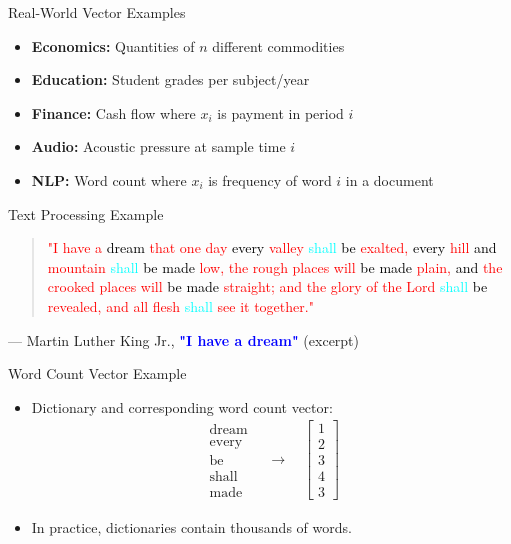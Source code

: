 \begin{frame}{Real-World Vector Examples}
    \begin{itemize}
        \item \textbf{Economics:} Quantities of $n$ different commodities
        \item \textbf{Education:} Student grades per subject/year
        \item \textbf{Finance:} Cash flow where $x_i$ is payment in period $i$
        \item \textbf{Audio:} Acoustic pressure at sample time $i$
        \item \textbf{NLP:} Word count where $x_i$ is frequency of word $i$ in a document
    \end{itemize}
\end{frame}

\begin{frame}{Text Processing Example}
    \begin{quote}
        \textcolor{red}{
        "I have a \textcolor{black}{dream} that one day \textcolor{black}{every} valley \textcolor{cyan}{shall} \textcolor{black}{be} exalted, \textcolor{black}{every} hill \textcolor{black}{and} mountain \textcolor{cyan}{shall}  \textcolor{black}{be} \textcolor{black}{made} low, 
        the rough places will \textcolor{black}{be} \textcolor{black}{made} plain, \textcolor{black}{and} the crooked places will \textcolor{black}{be} \textcolor{black}{made} straight; 
        and the glory of the Lord \textcolor{cyan}{shall}  \textcolor{black}{be} revealed, and all flesh \textcolor{cyan}{shall}  see it together."
        }
    \end{quote}
    \noindent — Martin Luther King Jr., \textcolor{blue}{\textbf{"I have a dream"}} (excerpt)
\end{frame}

\begin{frame}{Word Count Vector Example}
    \begin{itemize}
        \item Dictionary and corresponding word count vector:
        \begin{align*}
            \begin{array}{r}
                \text{dream} \\
                \text{every} \\
                \text{be} \\
                \text{shall} \\
                \text{made}
            \end{array} \quad \rightarrow \quad 
            \begin{bmatrix}
                1 \\ 2 \\ 3 \\ 4 \\ 3
            \end{bmatrix}
        \end{align*}
        \item In practice, dictionaries contain thousands of words.
    \end{itemize}
\end{frame}